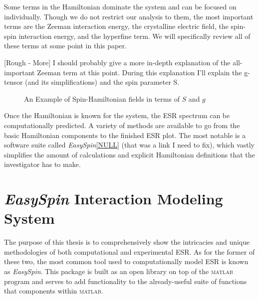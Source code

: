 \documentclass[oneside, astronomy, noacknowlegments]{BYUPhys}
\begin{document}
Some terms in the Hamiltonian dominate the system and can be focused on individually. Though we do not restrict our analysis to them, the most important terms are the Zeeman interaction energy, the crystalline electric field, the spin-spin interaction energy, and the hyperfine term. We will specifically review all of these terms at some point in this paper.

[Rough - More] I should probably give a more in-depth explanation of the all-important Zeeman term at this point. During this explanation I'll explain the g-tensor (and its simplifications) and the spin parameter S.

\begin{figure}
    \caption[Example of spin-hamiltonion fields]{\label{fig:HamFields}
     An Example of Spin-Hamiltonian fields in terms of $S$ and $g$}
 \end{figure}

Once the Hamiltonian is known for the system, the ESR spectrum can be computationally predicted. A variety of methods are available to go from the basic Hamiltonian components to the finished ESR plot. The most notable is a software suite called \textit{EasySpin}\ref{NULL} (that was a link I need to fix), which vastly simplifies the amount of calculations and explicit Hamiltonian definitions that the investigator has to make.

\section{\textit{EasySpin} Interaction Modeling System}

The purpose of this thesis is to comprehensively show the intricacies and unique methodologies of both computational and experimental ESR. As for the former of these two, the most common tool used to computationally model ESR is known as \textit{EasySpin}. This package is built as an open library on top of the \textsc{matlab} program and serves to add functionality to the already-useful suite of functions that components within \textsc{matlab}.
\end{document}
